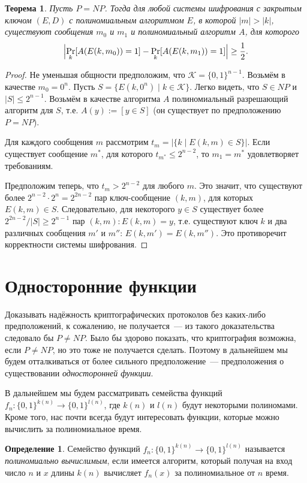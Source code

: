 \documentclass[12pt,a4paper]{article}
\newcommand{\bits}{\{0,1\}}
\theoremstyle{definition}
\newtheorem{definition}{Определение}[section]
\theoremstyle{plain}
\newtheorem{theorem}{Теорема}[section]
\theoremstyle{remark}
\begin{document}
\begin{theorem}
Пусть $P=NP$. Тогда для любой системы шифрования с закрытым ключом $(E,D)$ 
с полиномиальным алгоритмом $E$, в которой $|m|>|k|$, существуют сообщения 
$m_0$ и $m_1$ и полиномиальный алгоритм $A$, для которого
$$\Bigl|\Pr_k[A(E(k,m_0)) = 1]-\Pr_k[A(E(k,m_1)) = 1]\Bigr|\ge\frac12.$$
\end{theorem}
\begin{proof}
Не уменьшая общности предположим, что $\mathcal K = \bits^{n-1}$. 
Возьмём в качестве $m_0 = 0^n$. 
Пусть $S = \{E(k, 0^n)\mid k\in\mathcal K\}$. Легко видеть, что $S\in NP$ и $|S|\le 2^{n-1}$. Возьмём в качестве алгоритма $A$ полиномиальный разрешающий алгоритм для $S$, т.е. $A(y) := [y\in S]$ (он существует по предположению $P=NP$).

Для каждого сообщения $m$ рассмотрим $t_m = \bigl|\{k\mid E(k, m) \in S\}\bigr|$. 
Если существует сообщение $m^*$, для которого $t_{m^*} \le 2^{n-2}$, то $m_1 = m^*$ удовлетворяет требованиям. 

Предположим теперь, что $t_m > 2^{n-2}$ для любого $m$. Это значит, что существуют более $2^{n-2}\cdot 2^n = 2^{2n - 2}$ пар ключ-сообщение $(k,m)$, для которых 
$E(k,m)\in S$. Следовательно, для некоторого $y\in S$ существует более $2^{2n - 2} / |S| \ge 2^{n-1}$ пар $(k,m): E(k,m) = y$, т.е. существуют ключ $k$ и два различных сообщения $m'$ и $m''$: $E(k,m') = E(k,m'')$. Это противоречит корректности системы шифрования.
\end{proof}

\section{Односторонние функции}
Доказывать надёжность криптографических протоколов без каких-либо предположений, к сожалению, не получается~--- из такого доказательства следовало бы $P\neq NP$.
Было бы здорово показать, что криптография возможна, если $P\neq NP$, но это тоже не получается сделать. Поэтому в дальнейшем мы
будем отталкиваться от более сильного предположение~--- предположения о существовании \emph{односторонней функции}.

В дальнейшем мы будем рассматривать семейства функций $f_n: \bits^{k(n)} \to \bits^{l(n)}$, где $k(n)$ и $l(n)$ будут некоторыми полиномами. Кроме того, нас почти всегда будут интересовать
функции, которые можно вычислить за полиномиальное время.

\begin{definition}
    Семейство функций $f_n: \bits^{k(n)} \to \bits^{l(n)}$ называется 
    \emph{полиномиально вычислимым}, если имеется алгоритм, который получая на вход 
    число $n$ и $x$ длины $k(n)$ вычисляет $f_n(x)$ за полиномиальное от $n$ время.
\end{definition}
\end{document}
